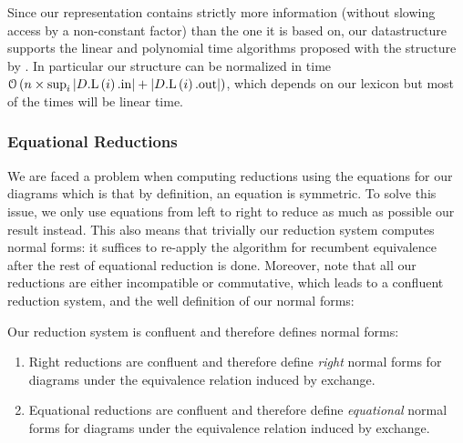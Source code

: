 \smallskip

Since our representation contains strictly more information (without slowing
access by a non-constant factor) than the one it is based on, our
datastructure supports the linear and polynomial time algorithms proposed with
the structure by \cite{delpeuchNormalizationPlanarString2022}.
In particular our structure can be normalized in time
$\mathcal{O}\left( n \times \sup_{i} \left|D\mathrm{.L}\left(i\right)\mathrm{.in}\right| + \left|D\mathrm{.L}\left(i\right)\mathrm{.out}\right|
	\right)$, which depends on our lexicon but most of the times will be linear
time.

\subsubsection{Equational Reductions}
We are faced a problem when computing reductions using the equations for our diagrams
which is that by definition, an equation is symmetric.
To solve this issue, we only use equations from left to right to reduce as much as
possible our result instead.
This also means that trivially our reduction system computes normal forms: it suffices
to re-apply the algorithm for recumbent equivalence after the rest of equational
reduction is done.
Moreover, note that all our reductions are either incompatible or commutative, which
leads to a confluent reduction system, and the well definition of our normal forms:
\begin{theorem}[Confluence]\label{thm:confluence}
	Our reduction system is confluent and therefore defines normal forms:
	\begin{enumerate}
		\item Right reductions are confluent and therefore define \emph{right} normal forms for
		      diagrams under the equivalence relation induced by exchange.
		\item Equational reductions are confluent and therefore define \emph{equational}
		      normal forms for diagrams under the equivalence relation induced by exchange.
	\end{enumerate}
\end{theorem}

